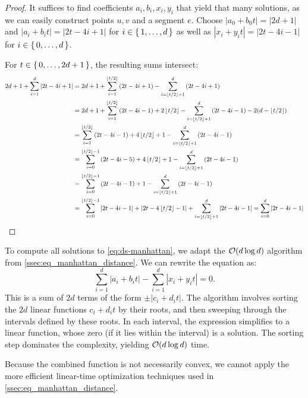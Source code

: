 \begin{proof}
	It suffices to find coefficients \(a_i, b_i, x_i, y_i\) that yield that many solutions, as we can easily construct points \(u, v\) and a segment \(e\). Choose \(|a_0 + b_0 t| = |2d +1|\) and \(|a_i + b_i t| = |2t - 4i + 1|\) for \(i \in \set{1, \dots, d}\) as well as \(|x_i + y_i t| = |2t - 4i - 1|\) for \(i \in \set{0, \dots, d}\).

	For \(t \in \set{0, \dots, 2d+1}\), the resulting sums intersect:
	\begin{align*}
		2d+1 + \sum_{i=1}^d \left|2t - 4i + 1\right| &= 2d+1 + \sum_{i=1}^{\left\lfloor t/2\right\rfloor} \left(2t - 4i + 1\right)  - \sum_{i=\left\lfloor t/2\right\rfloor+1}^d \left(2t - 4i + 1\right) \\
		 &= 2d+1 + \sum_{i=1}^{\left\lfloor t/2\right\rfloor} \left(2t - 4i - 1\right) + 2\left\lfloor t/2\right\rfloor - \sum_{i=\left\lfloor t/2\right\rfloor+1}^d \left(2t - 4i - 1\right)  - 2(d-\left\lfloor t/2\right\rfloor)\\
		 &= \sum_{i=1}^{\left\lfloor t/2\right\rfloor} \left(2t - 4i - 1\right) + 4\left\lfloor t/2\right\rfloor + 1 - \sum_{i=\left\lfloor t/2\right\rfloor+1}^d \left(2t - 4i - 1\right) \\
		 &= \sum_{i=0}^{\left\lfloor t/2\right\rfloor-1} \left(2t - 4i - 5\right) + 4\left\lfloor t/2\right\rfloor + 1 - \sum_{i=\left\lfloor t/2\right\rfloor+1}^d \left(2t - 4i - 1\right) \\
		 &= \sum_{i=0}^{\left\lfloor t/2\right\rfloor-1} \left(2t - 4i - 1\right) + 1 - \sum_{i=\left\lfloor t/2\right\rfloor+1}^d \left(2t - 4i - 1\right) \\
		 &= \sum_{i=0}^{\left\lfloor t/2\right\rfloor-1} \left|2t - 4i - 1\right| + \left|2t - 4\left\lfloor t/2\right\rfloor-1\right|+ \sum_{i=\left\lfloor t/2\right\rfloor+1}^d \left|2t - 4i - 1\right| = \sum_{i=0}^d \left|2t - 4i - 1\right|
	\end{align*}
\end{proof}

To compute all solutions to \cref{eq:ds-manhattan}, we adapt the \(\mathcal{O}(d\log d)\) algorithm from \cref{ssec:eq_manhattan_distance}. We can rewrite the equation as: 
	\[\sum_{i=1}^d |a_i + b_i t| - \sum_{i=1}^d |x_i + y_i t| = 0.\]
This is a sum of \(2d\) terms of the form \(\pm |c_i + d_i t|\). The algorithm involves sorting the \(2d\) linear functions \(c_i + d_i t\) by their roots, and then sweeping through the intervals defined by these roots. In each interval, the expression simplifies to a linear function, whose zero (if it lies within the interval) is a solution. The sorting step dominates the complexity, yielding \(\mathcal{O}(d \log d)\) time. 

Because the combined function is not necessarily convex, we cannot apply the more efficient linear-time optimization techniques used in \cref{ssec:eq_manhattan_distance}.

